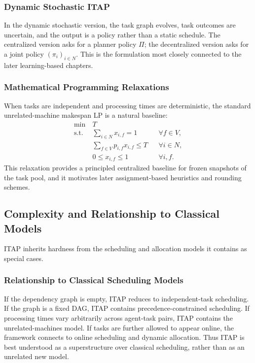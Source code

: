 \subsubsection{Dynamic Stochastic ITAP}

In the dynamic stochastic version, the task graph evolves, task outcomes are uncertain, and the output is a policy rather than a static schedule. The centralized version asks for a planner policy \(\Pi\); the decentralized version asks for a joint policy \((\pi_i)_{i\in N}\). This is the formulation most closely connected to the later learning-based chapters.

\subsubsection{Mathematical Programming Relaxations}

When tasks are independent and processing times are deterministic, the standard unrelated-machine makespan LP is a natural baseline:
\[
\begin{aligned}
\min \ & T \\
\text{s.t. } &
\sum_{i\in N} x_{i,f} = 1
&& \forall f\in V, \\
&
\sum_{f\in V} p_{i,f} x_{i,f} \le T
&& \forall i\in N, \\
&
0 \le x_{i,f} \le 1
&& \forall i,f.
\end{aligned}
\]
This relaxation provides a principled centralized baseline for frozen snapshots of the task pool, and it motivates later assignment-based heuristics and rounding schemes.

\subsection{Complexity and Relationship to Classical Models}

ITAP inherits hardness from the scheduling and allocation models it contains as special cases.

\subsubsection{Relationship to Classical Scheduling Models}

If the dependency graph is empty, ITAP reduces to independent-task scheduling. If the graph is a fixed DAG, ITAP contains precedence-constrained scheduling. If processing times vary arbitrarily across agent-task pairs, ITAP contains the unrelated-machines model. If tasks are further allowed to appear online, the framework connects to online scheduling and dynamic allocation. Thus ITAP is best understood as a superstructure over classical scheduling, rather than as an unrelated new model.


